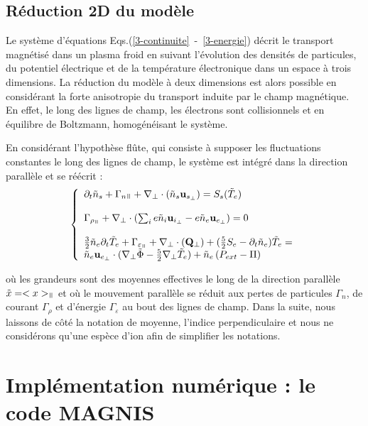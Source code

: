 \subsection{Réduction 2D du modèle}
Le système d'équations Eqs.(\ref{3-continuite}~-~\ref{3-energie}) décrit le
transport magnétisé dans un plasma froid en suivant l'évolution des densités de
particules, du potentiel électrique et de la température électronique 
dans un espace à trois dimensions. La réduction du modèle à deux dimensions est
alors possible en considérant la forte anisotropie du transport induite par le champ magnétique.
En effet, le long des lignes de champ, les électrons sont collisionnels et en équilibre de 
Boltzmann, homogénéisant le système. 

En considérant l'hypothèse flûte, qui consiste à supposer les fluctuations constantes
le long des lignes de champ, le système est intégré dans la direction parallèle et se
réécrit :
\begin{equation}
\label{3-equations2D}
\left\{\begin{array}{lr}
\partial_t \tilde{n}_s + \Gamma_{n\para} +
\nabla_\perp\cdot\left(\tilde{n}_s\mathbf{u}_{s_\perp}\right)=S_s(\tilde{T}_e)
\\\\
\Gamma_{\rho_\para}+\nabla_\perp\cdot(\sum_ie\tilde{n}_i\mathbf{u}_{i_\perp}
-e\tilde{n}_e\mathbf{u}_{e_\perp})=0
\\\\
\frac{3}{2}\tilde{n}_e\partial_t\tilde{T}_e + \Gamma_{\varepsilon_\para}+\nabla_\perp\cdot(\mathbf{Q}_\perp) +
(\frac{5}{2}S_e-\partial_t\tilde{n}_e)\tilde{T}_e =\\\tilde{n}_e\mathbf{u}_{e_\perp}\cdot(\nabla_\perp
\tilde{\Phi}-\frac{5}{2}\nabla_\perp \tilde{T}_e)+\tilde{n}_e\left(P_{ext}-\Pi\right)
\end{array}\right.
\end{equation}

où les grandeurs sont des moyennes effectives le long de la direction parallèle $\tilde{x}=<x>_\para$ 
et où le mouvement parallèle se réduit aux pertes de particules $\Gamma_n$, de courant $\Gamma_\rho$ et d'énergie $\Gamma_\varepsilon$
au bout des lignes de champ. Dans la suite, nous laissons de côté
la notation de moyenne, l'indice perpendiculaire et nous ne considérons qu'une espèce d'ion afin de simplifier les notations.

\section{Implémentation numérique : le code MAGNIS}

